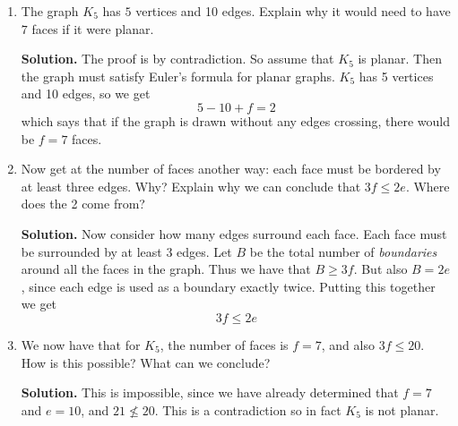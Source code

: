 \documentclass{book}
\begin{document}
\setcounter{project}{27}
\addtocounter{project}{-1}
\begin{activity}[]\label{activity-22}
\leavevmode%
\begin{enumerate}[font=\bfseries,label=(\alph*),ref=\alph*]
\item\label{task-36} \hypertarget{p-283}{}%
The graph \(K_5\) has \(5\) vertices and 10 edges.  Explain why it would need to have \(7\) faces if it were planar.%
\par\smallskip%
\noindent\textbf{Solution.}\hypertarget{solution-19}{}\quad%
\hypertarget{p-284}{}%
The proof is by contradiction. So assume that \(K_5\) is planar. Then the graph must satisfy Euler's formula for planar graphs. \(K_5\) has 5 vertices and 10 edges, so we get%
\begin{equation*}
5 - 10 + f = 2
\end{equation*}
which says that if the graph is drawn without any edges crossing, there would be \(f = 7\) faces.%
\item\label{task-37} \hypertarget{p-285}{}%
Now get at the number of faces another way: each face must be bordered by at least three edges.  Why?  Explain why we can conclude that \(3f \le 2e\).  Where does the 2 come from?%
\par\smallskip%
\noindent\textbf{Solution.}\hypertarget{solution-20}{}\quad%
\hypertarget{p-286}{}%
Now consider how many edges surround each face. Each face must be surrounded by at least 3 edges. Let \(B\) be the total number of \emph{boundaries} around all the faces in the graph. Thus we have that \(B \ge 3f\). But also \(B = 2e\), since each edge is used as a boundary exactly twice. Putting this together we get%
\begin{equation*}
3f \le 2e
\end{equation*}
%
\item\label{task-38} \hypertarget{p-287}{}%
We now have that for \(K_5\), the number of faces is \(f = 7\), and also \(3f \le 20\).  How is this possible?  What can we conclude?%
\par\smallskip%
\noindent\textbf{Solution.}\hypertarget{solution-21}{}\quad%
\hypertarget{p-288}{}%
This is impossible, since we have already determined that \(f = 7\) and \(e = 10\), and \(21 \not\le 20\). This is a contradiction so in fact \(K_5\) is not planar.%
\end{enumerate}
\end{activity}
\end{document}
